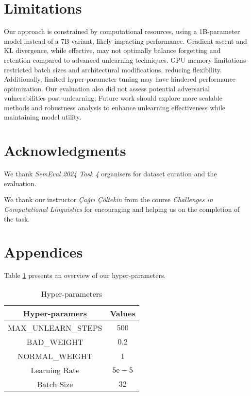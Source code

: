 \documentclass[11pt]{article}
\begin{document}
\section*{Limitations}

Our approach is constrained by computational resources, using a 1B-parameter model instead of a 7B variant, likely impacting performance. Gradient ascent and KL divergence, while effective, may not optimally balance forgetting and retention compared to advanced unlearning techniques. GPU memory limitations restricted batch sizes and architectural modifications, reducing flexibility. Additionally, limited hyper-parameter tuning may have hindered performance optimization. Our evaluation also did not assess potential adversarial vulnerabilities post-unlearning. Future work should explore more scalable methods and robustness analysis to enhance unlearning effectiveness while maintaining model utility.  


\section*{Acknowledgments}
We thank \textit{SemEval 2024 Task 4} organisers for dataset curation and the evaluation.

We thank our instructor \textit{Çağrı Çöltekin} from the course \textit{Challenges in Computational Linguistics} for encouraging and helping us on the completion of the task.





\appendix

\section{Appendices}

Table \ref{tab:hyper} presents an overview of our hyper-parameters.

\begin{table}[h]
    \centering
    \begin{tabular}{c|c}
        \hline
        \textbf{Hyper-paramers} & \textbf{Values} \\
        \hline
        MAX\_UNLEARN\_STEPS & $500$ \\
        BAD\_WEIGHT & $0.2$ \\
        NORMAL\_WEIGHT & $1$ \\
        Learning Rate & $5\mathrm{e}-5$ \\
        Batch Size & $32$ \\
        \hline
    \end{tabular}
    \caption{Hyper-parameters}
    \label{tab:hyper}
\end{table}

\label{sec:appendix}
\end{document}
